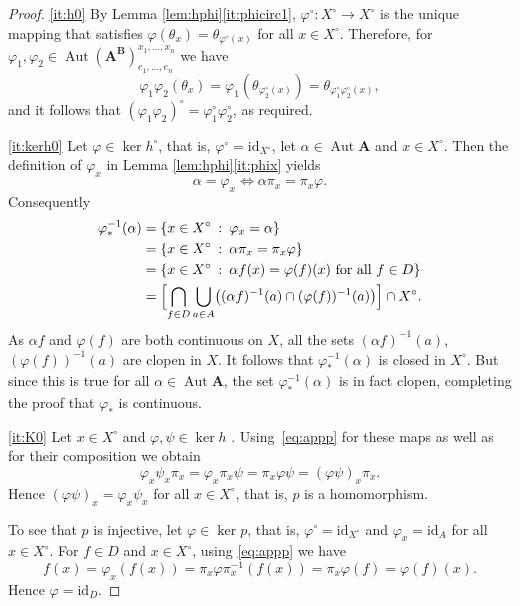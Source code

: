 \documentclass[12pt,a4paper,reqno]{amsart}
\numberwithin{equation}{section}
\theoremstyle{plain}
\theoremstyle{definition}
\newcommand{\A}{\mathbf{A}}
\newcommand{\ABxe}{(\mathbf{A^B})^{x_1,\dots,x_n}_{e_1,\dots,e_n}}
\newcommand{\id}{\mathrm{id}}
\DeclareMathOperator{\Aut}{Aut}
\newcommand{\st}{\: :\:}
\begin{document}
\begin{proof}
\eqref{it:h0} By Lemma \ref{lem:hphi}\eqref{it:phicirc1}, $\varphi^\circ\colon X^\circ\rightarrow X^\circ$ is the unique
 mapping that satisfies $\varphi(\theta_x)=\theta_{\varphi^\circ(x)}$ for all $x\in X^\circ$.
Therefore, for $\varphi_1,\varphi_2\in \Aut\ABxe$ we have
\[
\varphi_1\varphi_2(\theta_x)=\varphi_1(\theta_{\varphi_2^\circ(x)})=
\theta_{\varphi_1^\circ\varphi_2^\circ(x)},
\]
and it follows that $(\varphi_1\varphi_2)^\circ=\varphi_1^\circ\varphi_2^\circ$, as required.

 \eqref{it:kerh0}
 Let $\varphi\in\ker h^\circ$, that is, $\varphi^\circ = \id_{X^\circ}$, let $\alpha\in\Aut\A$ and $x\in X^\circ$.
 Then the definition of $\varphi_x$ in Lemma \ref{lem:hphi}\eqref{it:phix} yields
\begin{equation}\label{eq:appp}
 \alpha = \varphi_x \Leftrightarrow \alpha \pi_x = \pi_x \varphi.
\end{equation}
 Consequently
\begin{align*}
\varphi_*^{-1}(\alpha)
& = \{x \in X^\circ \st \varphi_x = \alpha\}\\
& = \{x \in X^\circ \st \alpha \pi_x = \pi_x \varphi\}\\
& = \{x \in X^\circ \st \alpha f(x) = \varphi(f)(x) \text{ for all } f\in D\} \\
&=
\Bigl[
\bigcap_{f \in D}
\bigcup_{a \in A} \bigl(
(\alpha f)^{-1}(a) \cap (\varphi(f))^{-1}(a) \bigr)
\Bigr]
\cap X^\circ .
\end{align*}
As $\alpha f$ and $\varphi(f)$ are both continuous on $X$, all the sets
$(\alpha f)^{-1}(a)$, $ (\varphi(f))^{-1}(a)$ are clopen in $X$.
It follows that $\varphi_*^{ -1}(\alpha)$ is closed in $X^\circ$. But since this is true for all $\alpha\in\Aut\A$,
the set $\varphi_*^{ -1}(\alpha)$ is in fact clopen, completing the proof that
$\varphi_*$ is continuous.

 \eqref{it:K0}
 Let $x\in X^\circ$ and $\varphi,\psi\in\ker h$ .
  Using~\eqref{eq:appp} for these maps as well as for their composition we obtain
 \[
 \varphi_x\psi_x\pi_x=\varphi_x\pi_x\psi=\pi_x\varphi\psi = (\varphi\psi)_x\pi_x.
\]
 Hence $(\varphi\psi)_x=\varphi_x\psi_x$ for all $x\in X^\circ$, that is, $p$ is a homomorphism.

 To see that $p$ is injective, let $\varphi\in\ker p$, that is, $\varphi^\circ=\id_{X^\circ}$ and
 $\varphi_x = \id_A$ for all $x\in X^\circ$.
 For $f\in D$ and $x\in X^\circ$, using \eqref{eq:appp} we have
\[ f(x) = \varphi_x(f(x)) = \pi_x\varphi\pi_x^{-1}(f(x)) = \pi_x\varphi(f) = \varphi(f) (x). \]
 Hence $\varphi=\id_D$.
\end{proof}
\end{document}
